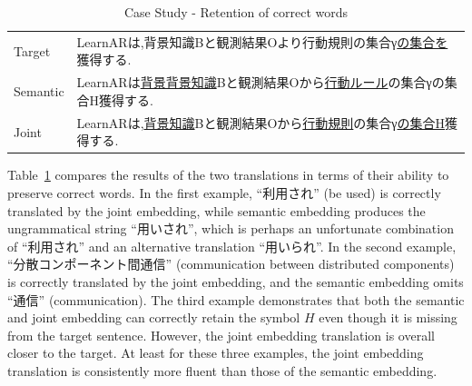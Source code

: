 \begin{table}[h]
    \begin{CJK}{UTF8}{ipxm}
        \begin{tabularx}{\textwidth}{p{1.2cm}b}
            Target & LearnARは,背景知識Bと観測結果Oより行動規則の集合γ\underline{の集合を}獲得する. \\
            Semantic & LearnARは\underline{背景背景知識}Bと観測結果Oから\underline{行動ルール}の集合γの集合H獲得する. \\
            Joint & LearnARは,\underline{背景知識}Bと観測結果Oから\underline{行動規則}の集合γ\underline{の集合H}獲得する. \\\midrule
        \end{tabularx}
    \end{CJK}

    \caption{Case Study - Retention of correct words}
    \label{tab:case_study1}
\end{table}

\begin{CJK}{UTF8}{ipxm}
    Table~\ref{tab:case_study1} compares the results of the two translations in terms of their ability to preserve correct words. In the first example, ``利用され'' (be used) is correctly translated by the joint embedding, while semantic embedding produces the ungrammatical string ``用いされ'', which is perhaps an unfortunate combination of ``利用され'' and an alternative translation ``用いられ''. In the second example, ``分散コンポーネント間通信'' (communication between distributed components) is correctly translated by the joint embedding, and the semantic embedding omits ``通信'' (communication).  The third example demonstrates that both the semantic and joint embedding can correctly retain the symbol $H$ even though it is missing from the target sentence. However, the joint embedding translation is overall closer to the target. At least for these three examples, the joint embedding translation is consistently more fluent than those of the semantic embedding.
\end{CJK}

